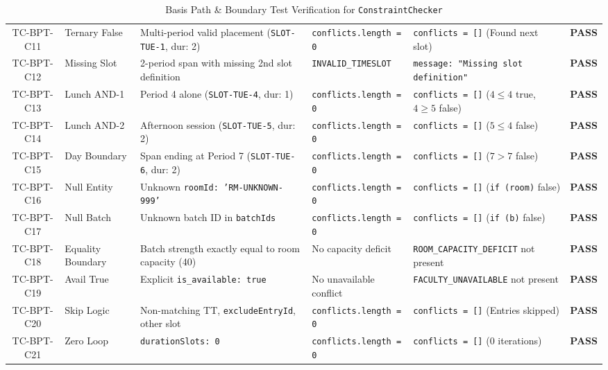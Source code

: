 \documentclass[11pt,a4paper]{article}
\begin{document}
\begin{table}[H]
\begin{tabular}{@{}clp{3.2cm}p{3.5cm}p{3.8cm}c@{}}
TC-BPT-C11 & Ternary False & Multi-period valid placement (\texttt{SLOT-TUE-1}, dur: 2) & \texttt{conflicts.length = 0} & \texttt{conflicts = []} (Found next slot) & \textbf{PASS} \\
TC-BPT-C12 & Missing Slot & 2-period span with missing 2nd slot definition & \texttt{INVALID\_TIMESLOT} & \texttt{message: "Missing slot definition"} & \textbf{PASS} \\
TC-BPT-C13 & Lunch AND-1 & Period 4 alone (\texttt{SLOT-TUE-4}, dur: 1) & \texttt{conflicts.length = 0} & \texttt{conflicts = []} ($4 \le 4$ true, $4 \ge 5$ false) & \textbf{PASS} \\
TC-BPT-C14 & Lunch AND-2 & Afternoon session (\texttt{SLOT-TUE-5}, dur: 2) & \texttt{conflicts.length = 0} & \texttt{conflicts = []} ($5 \le 4$ false) & \textbf{PASS} \\
TC-BPT-C15 & Day Boundary & Span ending at Period 7 (\texttt{SLOT-TUE-6}, dur: 2) & \texttt{conflicts.length = 0} & \texttt{conflicts = []} ($7 > 7$ false) & \textbf{PASS} \\
TC-BPT-C16 & Null Entity & Unknown \texttt{roomId: 'RM-UNKNOWN-999'} & \texttt{conflicts.length = 0} & \texttt{conflicts = []} (\texttt{if (room)} false) & \textbf{PASS} \\
TC-BPT-C17 & Null Batch & Unknown batch ID in \texttt{batchIds} & \texttt{conflicts.length = 0} & \texttt{conflicts = []} (\texttt{if (b)} false) & \textbf{PASS} \\
TC-BPT-C18 & Equality Boundary & Batch strength exactly equal to room capacity (40) & No capacity deficit & \texttt{ROOM\_CAPACITY\_DEFICIT} not present & \textbf{PASS} \\
TC-BPT-C19 & Avail True & Explicit \texttt{is\_available: true} & No unavailable conflict & \texttt{FACULTY\_UNAVAILABLE} not present & \textbf{PASS} \\
TC-BPT-C20 & Skip Logic & Non-matching TT, \texttt{excludeEntryId}, other slot & \texttt{conflicts.length = 0} & \texttt{conflicts = []} (Entries skipped) & \textbf{PASS} \\
TC-BPT-C21 & Zero Loop & \texttt{durationSlots: 0} & \texttt{conflicts.length = 0} & \texttt{conflicts = []} (0 iterations) & \textbf{PASS} \\ \bottomrule
\end{tabular}
\caption{Basis Path \& Boundary Test Verification for \texttt{ConstraintChecker}}
\end{table}

\newpage
\end{document}
